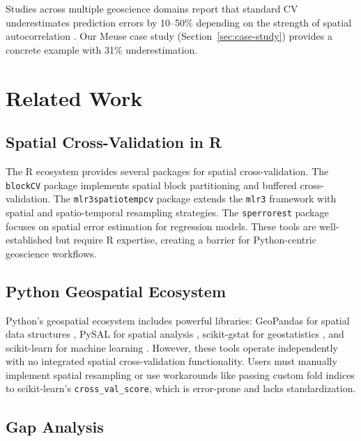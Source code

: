\documentclass[a4paper,fleqn]{cas-sc}
\begin{document}
Studies across multiple geoscience domains report that standard CV underestimates prediction errors by 10--50\% depending on the strength of spatial autocorrelation \citep{meyer2018improving, ploton2020spatial, wadoux2021spatial}. Our Meuse case study (Section~\ref{sec:case-study}) provides a concrete example with 31\% underestimation.


\section{Related Work}
\label{sec:related}

\subsection{Spatial Cross-Validation in R}

The R ecosystem provides several packages for spatial cross-validation. The \texttt{blockCV} package \citep{valavi2019blockcv} implements spatial block partitioning and buffered cross-validation. The \texttt{mlr3spatiotempcv} package \citep{schratz2019hyperparameter} extends the \texttt{mlr3} framework with spatial and spatio-temporal resampling strategies. The \texttt{sperrorest} package \citep{brenning2012spatial} focuses on spatial error estimation for regression models. These tools are well-established but require R expertise, creating a barrier for Python-centric geoscience workflows.

\subsection{Python Geospatial Ecosystem}

Python's geospatial ecosystem includes powerful libraries: GeoPandas for spatial data structures \citep{kelsey2020geopandas}, PySAL for spatial analysis \citep{rey2010pysal}, scikit-gstat for geostatistics \citep{malicke2021scikit}, and scikit-learn for machine learning \citep{pedregosa2011scikit}. However, these tools operate independently with no integrated spatial cross-validation functionality. Users must manually implement spatial resampling or use workarounds like passing custom fold indices to scikit-learn's \texttt{cross\_val\_score}, which is error-prone and lacks standardization.

\subsection{Gap Analysis}
\end{document}
